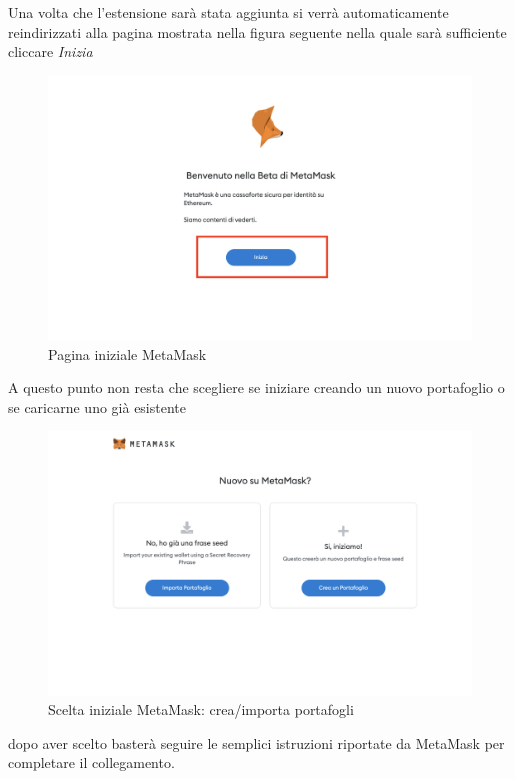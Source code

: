 Una volta che l'estensione sarà stata aggiunta si verrà automaticamente reindirizzati alla pagina mostrata nella figura seguente nella quale sarà sufficiente cliccare \textit{Inizia}

\begin{figure}[H]
    \centering
    \includegraphics[scale=0.3]{immagini/startMetamask.png}
    \caption{Pagina iniziale MetaMask}
\end{figure}

A questo punto non resta che scegliere se iniziare creando un nuovo portafoglio o se caricarne uno già esistente 

\begin{figure}[H]
    \centering
    \includegraphics[scale=0.3]{immagini/chooseMetamask.png}
    \caption{Scelta iniziale MetaMask: crea/importa portafogli}
\end{figure}

dopo aver scelto basterà seguire le semplici istruzioni riportate da MetaMask per completare il collegamento.

